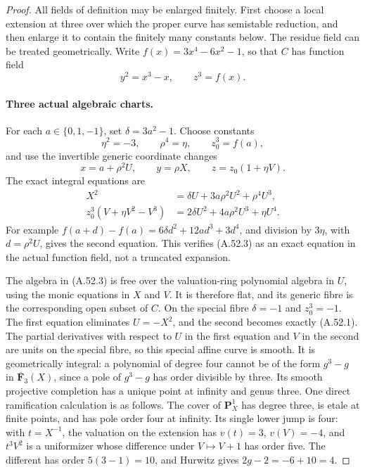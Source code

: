 \begin{proof}
All fields of definition may be enlarged finitely. First choose a
local extension at three over which the proper curve has semistable
reduction, and then enlarge it to contain the finitely many constants
below. The residue field can be treated geometrically. Write
\(f(x)=3x^4-6x^2-1\), so that \(C\) has function field
\[
                       y^2=x^3-x,\qquad z^3=f(x).
\]

\paragraph{Three actual algebraic charts.}
For each \(a\in\{0,1,-1\}\), set
\(\delta=3a^2-1\). Choose constants
\[
         \eta^2=-3,\qquad \rho^4=\eta,
                       \qquad z_0^3=f(a),
\]
and use the invertible generic coordinate changes
\[
       x=a+\rho^2U,\qquad y=\rho X,
                              \qquad z=z_0(1+\eta V).
\]
The exact integral equations are
\[
\begin{aligned}
 X^2&=\delta U+3a\rho^2U^2+\rho^4U^3,\\
 z_0^3(V+\eta V^2-V^3)
       &=2\delta U^2+4a\rho^2U^3+\eta U^4.
\end{aligned}                                                   \tag{A.52.3}
\]
For example
\(f(a+d)-f(a)=6\delta d^2+12ad^3+3d^4\), and division by
\(3\eta\), with \(d=\rho^2U\), gives the second equation.
This verifies (A.52.3) as an exact equation in the actual function
field, not a truncated expansion.

The algebra in (A.52.3) is free over the valuation-ring polynomial
algebra in \(U\), using the monic equations in \(X\) and \(V\).
It is therefore flat, and its generic fibre is the corresponding
open subset of \(C\). On the special fibre \(\delta=-1\) and
\(z_0^3=-1\). The first equation eliminates \(U=-X^2\), and
the second becomes exactly (A.52.1). The partial derivatives with
respect to \(U\) in the first equation and \(V\) in the second
are units on the special fibre, so this special affine curve is
smooth. It is geometrically integral: a polynomial of degree four
cannot be of the form \(g^3-g\) in \(\overline{\mathbf F}_3(X)\),
since a pole of \(g^3-g\) has order divisible by three. Its
smooth projective completion has a unique point at infinity and
genus three. One direct ramification calculation is as follows.
The cover of \(\mathbf P^1_X\) has degree three, is etale at
finite points, and has pole order four at infinity. Its single
lower jump is four: with \(t=X^{-1}\), the valuation on the
extension has \(v(t)=3\), \(v(V)=-4\), and \(t^3V^2\) is a
uniformizer whose difference under \(V\mapsto V+1\) has order
five. The different has order \(5(3-1)=10\), and Hurwitz gives
\(2g-2=-6+10=4\).


\end{proof}
